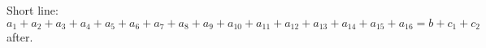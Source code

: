 \documentclass[10pt]{article}
\begin{document}
Short line:
\begin{equation} a_1 + a_2 + a_3 + a_4 + a_5 + a_6 + a_7 + a_8 + a_9 + a_{10} + a_{11} + a_{12} + a_{13} + a_{14} + a_{15} + a_{16} = b + c_1 + c_2 \tag{a long tag with $x^2$ in it} \end{equation}
after.
\end{document}
